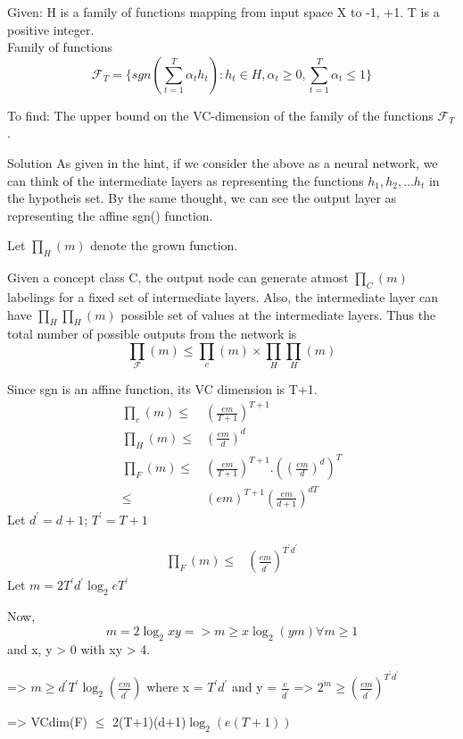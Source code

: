 \documentclass{article}
\begin{document}
\begin{description}
  \item{Given:}
    H is a family of functions mapping from input space X to {-1, +1}. T is a positive integer.\\
    Family of functions \begin{equation}
      \mathcal{F}_{T} = \{ sgn(\sum_{t=1}^{T} \alpha_{t}h_{t}): h_{t} \in H, \alpha_{t} \ge 0, \sum_{t=1}^{T} \alpha_{t} \le 1 \}
    \end{equation}
  \item{To find:} The upper bound on the VC-dimension of the family of the functions $ \mathcal{F}_{T} $.
  \item{Solution}
    As given in the hint, if we consider the above as a neural network, we can think of the intermediate layers as representing the functions $ h_{1}, h_{2}, ... h_{t}$ in the hypotheis set.  By the same thought, we can see the output layer as representing the affine sgn() function.

    Let $ \prod_{H}(m) $ denote the grown function.

    Given a concept class C, the output node can generate atmost $\prod_{C}(m)$ labelings for a fixed set of intermediate layers.  Also, the intermediate layer can have $ \prod_{H} \prod_{H}(m) $ possible set of values at the intermediate layers.  Thus the total number of possible outputs from the network is 
    \begin{equation}
      \prod_{\mathcal{F}}(m)  \le \prod_{c}(m) \times \prod_{H}\prod_{H}(m)
    \end{equation}

    Since sgn is an affine function, its VC dimension is T+1.
    \begin{align*}
      \prod_{c}(m) \le& (\frac{em}{T+1})^{T+1}\\
      \prod_{H}(m) \le& (\frac{em}{d})^{d}\\
      \prod_{F}(m) \le& (\frac{em}{T+1})^{T+1}.((\frac{em}{d})^{d})^{T}\\
      \le& (em)^{T+1}(\frac{em}{d+1})^{dT}
    \end{align*}
    Let $d^{'} = d+1$;  $ T^{'} = T+1$

    \begin{align*}
      \prod_{F}(m) \le& (\frac{em}{d^{'}})^{T^{'}d^{'}}
    \end{align*}
    Let $m = 2T^{'}d^{'} \log_{2}{eT^{'}} $

    Now, 
    \begin{equation}
      m = 2\log_{2}{xy} => m \ge x\log_{2}(ym) \forall m \ge 1
    \end{equation}
    and x, y > 0 with xy > 4.

    => $ m \ge d^{'}T^{'}\log_{2}(\frac{em}{d^{'}})$ where x = $ T^{'}d^{'}$ and y = $ \frac{e}{d^{'}}$
    => $2^{m} \ge (\frac{em}{d^{'}})^{T^{'}d^{'}}$

    => VCdim(F) $\le$ 2(T+1)(d+1)$\log_{2}(e(T+1)) $
\end{description}
\end{document}
